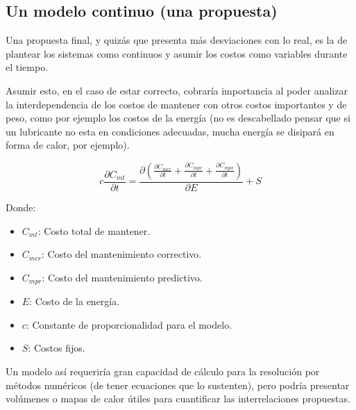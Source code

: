 \documentclass{article}
\begin{document}
\subsection{Un modelo continuo (una propuesta)}

Una propuesta final, y quizás que presenta más desviaciones con lo real, es la de plantear los sistemas como continuos y asumir los costos como variables durante el tiempo.

Asumir esto, en el caso de estar correcto, cobraría importancia al poder analizar la interdependencia de los costos de mantener con otros costos importantes y de peso, como por ejemplo los costos de la energía (no es descabellado pensar que si un lubricante no esta en condiciones adecuadas, mucha energía se disipará en forma de calor, por ejemplo).

\begin{equation}
c\frac{\partial C_{mt}}{\partial t} =  \frac{\partial (\frac{\partial C_{mcr}}{\partial t}+\frac{\partial C_{mpr}}{\partial t}+\frac{\partial C_{mpv}}{\partial t})}{\partial E}+S
\end{equation}

Donde:

\begin{itemize}
    \item $C_{mt}$: Costo total de mantener.
    \item $C_{mcr}$: Costo del mantenimiento correctivo.
    \item $C_{mpr}$: Costo del mantenimiento predictivo.
    \item $E$: Costo de la energía.
    \item $c$: Constante de proporcionalidad para el modelo.
    \item $S$: Costos fijos.
\end{itemize}

Un modelo así requeriría gran capacidad de cálculo para la resolución por métodos numéricos (de tener ecuaciones que lo sustenten), pero podría presentar volúmenes o mapas de calor útiles para cuantificar las interrelaciones propuestas.

\nocite{*}
    
\end{document}

